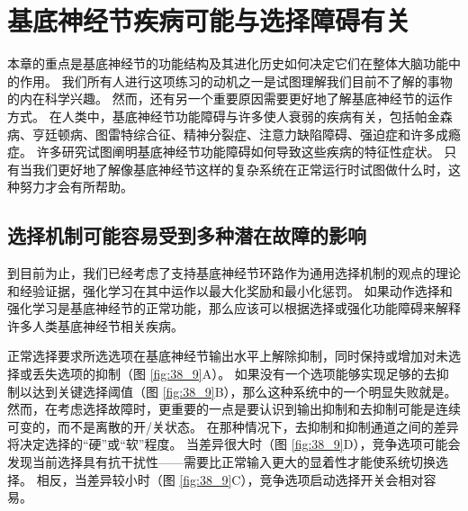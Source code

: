 \section{基底神经节疾病可能与选择障碍有关}
本章的重点是基底神经节的功能结构及其进化历史如何决定它们在整体大脑功能中的作用。 我们所有人进行这项练习的动机之一是试图理解我们目前不了解的事物的内在科学兴趣。 然而，还有另一个重要原因需要更好地了解基底神经节的运作方式。 在人类中，基底神经节功能障碍与许多使人衰弱的疾病有关，包括帕金森病、亨廷顿病、图雷特综合征、精神分裂症、注意力缺陷障碍、强迫症和许多成瘾症。 许多研究试图阐明基底神经节功能障碍如何导致这些疾病的特征性症状。 只有当我们更好地了解像基底神经节这样的复杂系统在正常运行时试图做什么时，这种努力才会有所帮助。

\subsection{选择机制可能容易受到多种潜在故障的影响}
到目前为止，我们已经考虑了支持基底神经节环路作为通用选择机制的观点的理论和经验证据，强化学习在其中运作以最大化奖励和最小化惩罚。 如果动作选择和强化学习是基底神经节的正常功能，那么应该可以根据选择或强化功能障碍来解释许多人类基底神经节相关疾病。

正常选择要求所选选项在基底神经节输出水平上解除抑制，同时保持或增加对未选择或丢失选项的抑制（图 \ref{fig:38_9}A）。
如果没有一个选项能够实现足够的去抑制以达到关键选择阈值（图 \ref{fig:38_9}B），那么这种系统中的一个明显失败就是。 然而，在考虑选择故障时，更重要的一点是要认识到输出抑制和去抑制可能是连续可变的，而不是离散的开/关状态。 在那种情况下，去抑制和抑制通道之间的差异将决定选择的“硬”或“软”程度。 当差异很大时（图 \ref{fig:38_9}D），竞争选项可能会发现当前选择具有抗干扰性——需要比正常输入更大的显着性才能使系统切换选择。 相反，当差异较小时（图 \ref{fig:38_9}C），竞争选项启动选择开关会相对容易。

